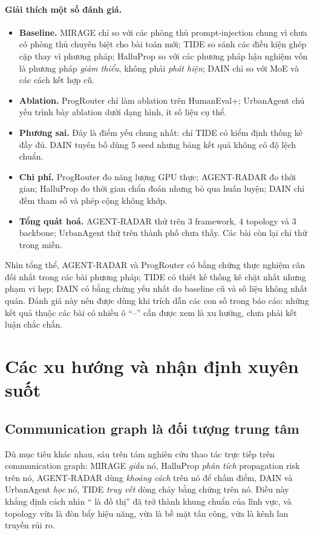 \paragraph{Giải thích một số đánh giá.}
\begin{itemize}
  \item \textbf{Baseline.} MIRAGE chỉ so với các phòng thủ prompt-injection chung vì chưa có phòng thủ chuyên biệt cho bài toán mới; TIDE so sánh các điều kiện ghép cặp thay vì phương pháp; HalluProp so với các phương pháp hậu nghiệm vốn là phương pháp \emph{giảm thiểu}, không phải \emph{phát hiện}; DAIN chỉ so với MoE và các cách kết hợp cũ.
  \item \textbf{Ablation.} ProgRouter chỉ làm ablation trên HumanEval+; UrbanAgent chủ yếu trình bày ablation dưới dạng hình, ít số liệu cụ thể.
  \item \textbf{Phương sai.} Đây là điểm yếu chung nhất: chỉ TIDE có kiểm định thống kê đầy đủ. DAIN tuyên bố dùng 5 seed nhưng bảng kết quả không có độ lệch chuẩn.
  \item \textbf{Chi phí.} ProgRouter đo năng lượng GPU thực; AGENT-RADAR đo thời gian; HalluProp đo thời gian chẩn đoán nhưng bỏ qua huấn luyện; DAIN chỉ đếm tham số và phép cộng không khớp.
  \item \textbf{Tổng quát hoá.} AGENT-RADAR thử trên 3 framework, 4 topology và 3 backbone; UrbanAgent thử trên thành phố chưa thấy. Các bài còn lại chỉ thử trong miền.
\end{itemize}

Nhìn tổng thể, AGENT-RADAR và ProgRouter có bằng chứng thực nghiệm cân đối nhất trong các bài phương pháp; TIDE có thiết kế thống kê chặt nhất nhưng phạm vi hẹp; DAIN có bằng chứng yếu nhất do baseline cũ và số liệu không nhất quán. Đánh giá này nên được dùng khi trích dẫn các con số trong báo cáo: những kết quả thuộc các bài có nhiều ô ``--'' cần được xem là xu hướng, chưa phải kết luận chắc chắn.

\section{Các xu hướng và nhận định xuyên suốt}
\label{sec:cmp-trends}

\subsection{Communication graph là đối tượng trung tâm}
Dù mục tiêu khác nhau, sáu trên tám nghiên cứu thao tác trực tiếp trên communication graph: MIRAGE \emph{giấu} nó, HalluProp \emph{phân tích} propagation risk trên nó, AGENT-RADAR dùng \emph{khoảng cách} trên nó để chấm điểm, DAIN và UrbanAgent \emph{học} nó, TIDE \emph{truy vết} dòng chảy bằng chứng trên nó. Điều này khẳng định cách nhìn ``\MAS{} là đồ thị'' đã trở thành khung chuẩn của lĩnh vực, và topology vừa là đòn bẩy hiệu năng, vừa là bề mặt tấn công, vừa là kênh lan truyền rủi ro.

